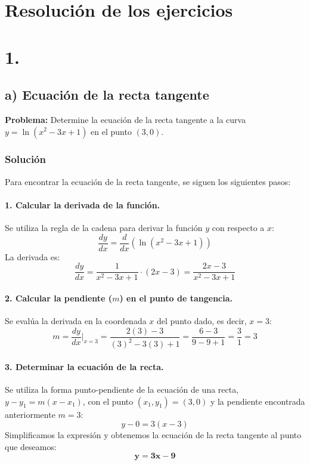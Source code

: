 \documentclass[12pt, letterpaper]{article}
\begin{document}
\section*{Resolución de los ejercicios}
\section*{1.}
\subsection*{a) Ecuación de la recta tangente}
\textbf{Problema:} Determine la ecuación de la recta tangente a la curva $y = \ln(x^2 - 3x + 1)$ en el punto $(3,0)$.

\subsubsection*{Solución}
Para encontrar la ecuación de la recta tangente, se siguen los siguientes pasos:

\paragraph{1. Calcular la derivada de la función.}
Se utiliza la regla de la cadena para derivar la función $y$ con respecto a $x$:
$$
\frac{dy}{dx} = \frac{d}{dx} \left( \ln(x^2 - 3x + 1) \right)
$$
La derivada es:
$$
\frac{dy}{dx} = \frac{1}{x^2 - 3x + 1} \cdot (2x - 3) = \frac{2x - 3}{x^2 - 3x + 1}
$$

\paragraph{2. Calcular la pendiente ($m$) en el punto de tangencia.}
Se evalúa la derivada en la coordenada $x$ del punto dado, es decir, $x=3$:
$$
m = \frac{dy}{dx}\bigg|_{x=3} = \frac{2(3) - 3}{(3)^2 - 3(3) + 1} = \frac{6 - 3}{9 - 9 + 1} = \frac{3}{1} = 3
$$

\paragraph{3. Determinar la ecuación de la recta.}
Se utiliza la forma punto-pendiente de la ecuación de una recta, $y - y_1 = m(x - x_1)$, con el punto $(x_1, y_1) = (3,0)$ y la pendiente encontrada anteriormente $m=3$:
$$
y - 0 = 3(x - 3)
$$
Simplificamos la expresión y obtenemos la ecuación de la recta tangente al punto que deseamos:
$$
\mathbf{y = 3x - 9}
$$
\end{document}

